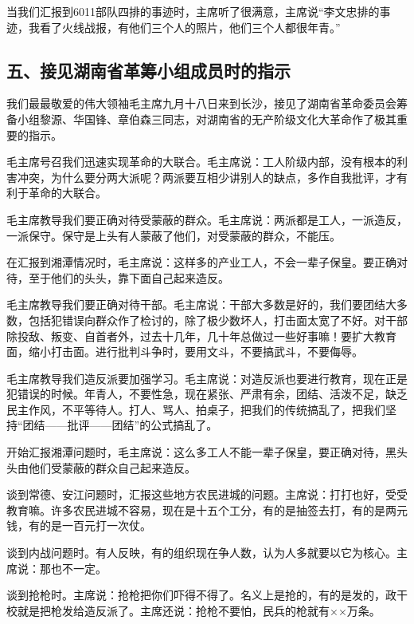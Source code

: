 当我们汇报到6011部队四排的事迹时，主席听了很满意，主席说“李文忠排的事迹，我看了火线战报，有他们三个人的照片，他们三个人都很年青。”


\subsection{五、接见湖南省革筹小组成员时的指示}

我们最最敬爱的伟大领袖毛主席九月十八日来到长沙，接见了湖南省革命委员会筹备小组黎源、华国锋、章伯森三同志，对湖南省的无产阶级文化大革命作了极其重要的指示。

毛主席号召我们迅速实现革命的大联合。毛主席说：工人阶级内部，没有根本的利害冲突，为什么要分两大派呢？两派要互相少讲别人的缺点，多作自我批评，才有利于革命的大联合。

毛主席教导我们要正确对待受蒙蔽的群众。毛主席说：两派都是工人，一派造反，一派保守。保守是上头有人蒙蔽了他们，对受蒙蔽的群众，不能压。

在汇报到湘潭情况时，毛主席说：这样多的产业工人，不会一辈子保皇。要正确对待，至于他们的头头，靠下面自己起来造反。

毛主席教导我们要正确对待干部。毛主席说：干部大多数是好的，我们要团结大多数，包括犯错误向群众作了检讨的，除了极少数坏人，打击面太宽了不好。对干部除投敌、叛变、自首者外，过去十几年，几十年总做过一些好事嘛！要扩大教育面，缩小打击面。进行批判斗争时，要用文斗，不要搞武斗，不要侮辱。

毛主席教导我们造反派要加强学习。毛主席说：对造反派也要进行教育，现在正是犯错误的时候。年青人，不要性急，现在紧张、严肃有余，团结、活泼不足，缺乏民主作风，不平等待人。打人、骂人、拍桌子，把我们的传统搞乱了，把我们坚持“团结——批评——团结”的公式搞乱了。


开始汇报湘潭问题时，毛主席说：这么多工人不能一辈子保皇，要正确对待，黑头头由他们受蒙蔽的群众自己起来造反。

谈到常德、安江问题时，汇报这些地方农民进城的问题。主席说：打打也好，受受教育嘛。许多农民进城不容易，现在是十五个工分，有的是抽签去打，有的是两元钱，有的是一百元打一次仗。

谈到内战问题时。有人反映，有的组织现在争人数，认为人多就要以它为核心。主席说：那也不一定。

谈到抢枪时。主席说：抢枪把你们吓得不得了。名义上是抢的，有的是发的，政干校就是把枪发给造反派了。主席还说：抢枪不要怕，民兵的枪就有××万条。

